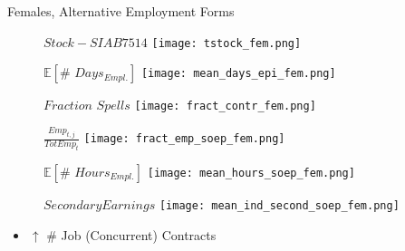 \documentclass{beamer}
\begin{document}
\begin{frame}{Females, Alternative Employment Forms}
\begin{figure}[!t]
\centering
\begin{minipage}[b]{0.3\textwidth}{$Stock - SIAB7514$}
\centering
\texttt{[image: tstock\_fem.png]}
\end{minipage}
\begin{minipage}[b]{0.3\textwidth}{$\mathbb{E}[\# \,\, Days_{Empl.}]$}
\centering
\texttt{[image: mean\_days\_epi\_fem.png]}
\end{minipage}
\begin{minipage}[b]{0.3\textwidth}{$Fraction \,\, Spells$}
\centering
\texttt{[image: fract\_contr\_fem.png]}
\end{minipage}
\end{figure}
\begin{figure}[!t]
\centering
\begin{minipage}[b]{0.3\textwidth}{$\frac{Emp_{t,j}}{TotEmp_{t}}$}
\centering
\texttt{[image: fract\_emp\_soep\_fem.png]}
\end{minipage}
\begin{minipage}[b]{0.3\textwidth}{$\mathbb{E}[\# \,\, Hours_{Empl.}]$}
\centering
\texttt{[image: mean\_hours\_soep\_fem.png]}
\end{minipage}
\begin{minipage}[b]{0.3\textwidth}{$Secondary Earnings$}
\centering
\texttt{[image: mean\_ind\_second\_soep\_fem.png]}
\end{minipage}
\end{figure}
\begin{itemize}
\setlength{\itemsep}{0.7 cm}
\item $\uparrow$ \# Job (Concurrent) Contracts
\end{itemize}
\end{frame}
\end{document}

